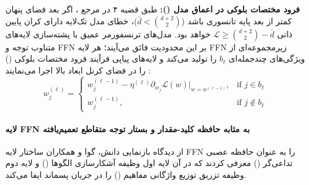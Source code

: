 \textbf{فرود مختصات بلوکی در اعماق مدل ():}
طبق قضیه ۴ در مرجع \cite{sun2025role}، اگر بعد فضای پنهان کمتر از بعد پایه تانسوری باشد ($\bar{d} < \binom{d+2}{2}$)، خطای مدل تک‌لایه دارای کران پایین ذاتی $\mathcal{L} \ge \binom{d+2}{2} - \bar{d}$ خواهد بود. مدل‌های ترنسفورمر عمیق با پشته‌سازی لایه‌های متناوب توجه و FFN بر این محدودیت فائق می‌آیند؛ هر لایه FFN زیرمجموعه‌ای از ویژگی‌های چندجمله‌ای $b_\ell$ را تولید می‌کند و لایه‌های پیاپی فرآیند فرود مختصات بلوکی () را در فضای کرنل ابعاد بالا اجرا می‌نمایند \cite{sun2025role}:
\begin{equation}
    w_j^{(\ell)} = \begin{cases} 
        w_j^{(\ell-1)} - \eta^{(\ell)} \partial_{w_j} \mathcal{L}(w)\big|_{w=w^{(\ell-1)}}, & \text{if } j \in b_\ell \\ 
        w_j^{(\ell-1)}, & \text{if } j \notin b_\ell 
    \end{cases}
\end{equation}

\paragraph*{لایه FFN به مثابه حافظه کلید-مقدار و بستار توجه متقاطع تعمیم‌یافته}
از دیدگاه بازنمایی دانش، گوا و همکاران \cite{geva2021transformer, geva2022transformer} ساختار لایه FFN را به عنوان حافظه عصبی تداعی‌گر () معرفی کردند که در آن لایه اول وظیفه آشکارسازی الگوها () و لایه دوم وظیفه تزریق توزیع واژگانی مفاهیم () را در جریان پسماند ایفا می‌کند. 

